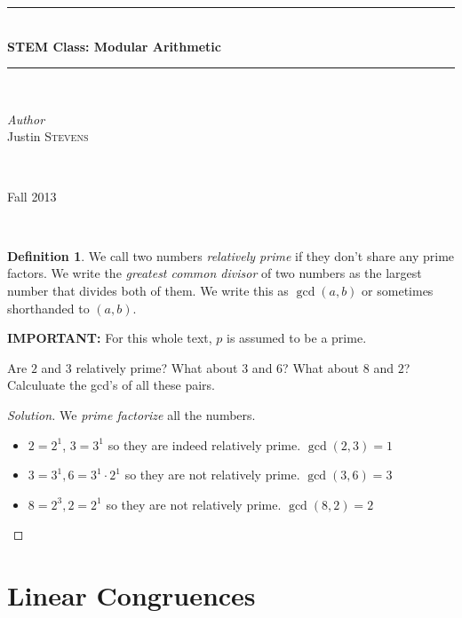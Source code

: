 \documentclass[12pt,openany]{book}
\theoremstyle{definition}
\newtheorem{defi}{Definition}[section]
\newenvironment{soln}{\begin{proof}[Solution]}{\end{proof}}
\theoremstyle{definition}
\newcommand{\HRule}{\rule{\linewidth}{0.5mm}} %
\begin{document}
\begin{center}
\HRule \\[0.4cm]
{ \huge \bfseries STEM Class:  Modular Arithmetic}\\[0.4cm] %
\HRule \\[1.5cm]
\begin{minipage}{0.4\textwidth}
\begin{flushleft} \large
\emph{Author}\\
Justin \textsc{Stevens} \newline
\end{flushleft}
\end{minipage}
~
\begin{minipage}{0.4\textwidth}
\begin{flushright} \large
Fall 2013
\end{flushright}
\end{minipage}\\[0.5cm]
\end{center}
\setcounter{chapter}{1}

\begin{defi}  We call two numbers \textit{relatively prime} if they don't share any prime factors.  We write the \textit{greatest common divisor} of two numbers as the largest number that divides both of them.  We write this as $\gcd(a,b)$ or sometimes shorthanded to $(a,b)$.    \end{defi}

\textbf{IMPORTANT:}  For this whole text, $p$ is assumed to be a prime.  

\begin{exmp}  Are $2$ and $3$ relatively prime?  What about $3$ and $6$?  What about $8$ and $2$?  Calculuate the gcd's of all these pairs. \end{exmp}
\begin{soln}  We \textit{prime factorize} all the numbers.
\begin{itemize}
\item $2=2^1$, $3=3^1$ so they are indeed relatively prime.  $\gcd(2,3)=1$
\item  $3=3^1, 6=3^1\cdot 2^1$ so they are not relatively prime.  $\gcd(3,6)=3$
\item  $8=2^3, 2=2^1$ so they are not relatively prime. $\gcd(8,2)=2$ \end{itemize}  
\end{soln}
\section{Linear Congruences}
\end{document}
